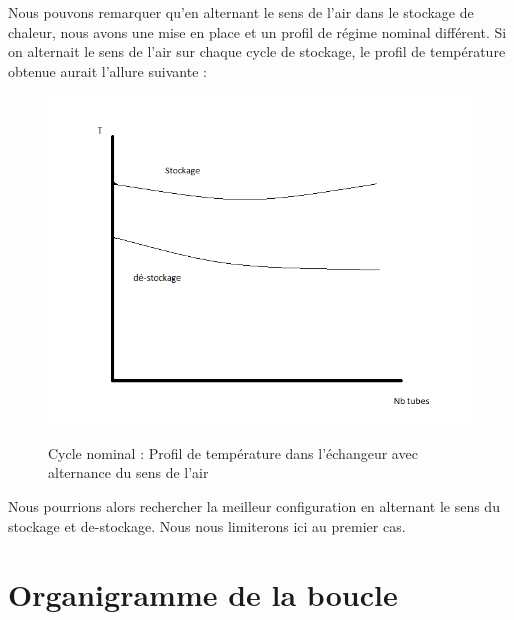 Nous pouvons remarquer qu'en alternant le sens de l'air dans le stockage de chaleur, nous avons une mise en place et un profil de régime nominal différent. Si on alternait le sens de l'air sur chaque cycle de stockage, le profil de température obtenue aurait l'allure suivante : 


\begin{figure}[!h]
	\centering
	\caption{Cycle nominal : Profil de température dans l'échangeur avec alternance du sens de l'air}
	\includegraphics[scale=0.4]{PHOTO/courbe4.png}
	\label{graph4}
\end{figure}

Nous pourrions alors rechercher la meilleur configuration en alternant le sens du stockage et de-stockage. Nous nous limiterons ici au premier cas. 

\newpage
\section{Organigramme de la boucle}

